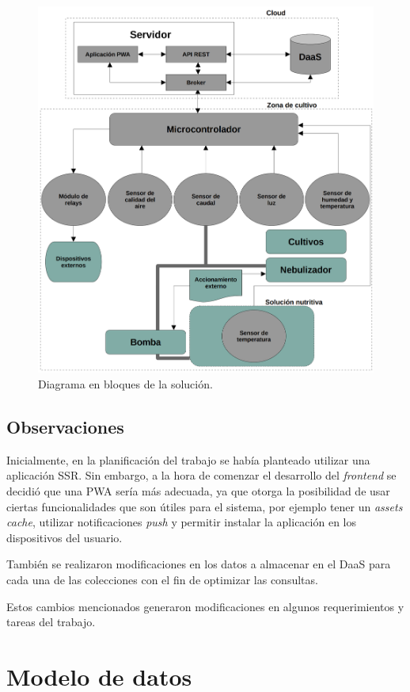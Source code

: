 \begin{figure}[H]
	\centering
	\includegraphics[width=.9\textwidth]{./Figures/Diagrama en bloques v10.png}
	\caption{Diagrama en bloques de la solución.}
	\label{fig:diagramaEnBloques}
\end{figure}

\subsection{Observaciones}
\label{sec:observaciones}

Inicialmente, en la planificación del trabajo se había planteado utilizar una aplicación SSR. Sin embargo, a la hora de comenzar el desarrollo del \textit{frontend} se decidió que una PWA sería más adecuada, ya que otorga la posibilidad de usar ciertas funcionalidades que son útiles para el sistema,  por ejemplo tener un \emph{assets cache}, utilizar notificaciones \emph{push} y permitir instalar la aplicación en los dispositivos del usuario. 

También se realizaron modificaciones en los datos a almacenar en el DaaS para cada una de las colecciones con el fin de optimizar las consultas.

Estos cambios mencionados generaron modificaciones en algunos requerimientos y tareas del trabajo.

\section{Modelo de datos}

